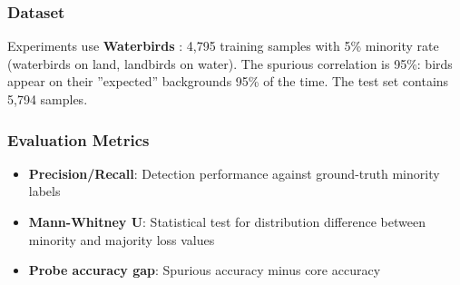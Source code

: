 
\subsubsection{Dataset}

Experiments use \textbf{Waterbirds} \citep{Sagawa2019}: 4,795 training samples with 5\% minority rate (waterbirds on land, landbirds on water). The spurious correlation is 95\%: birds appear on their ''expected'' backgrounds 95\% of the time. The test set contains 5,794 samples.

\subsubsection{Evaluation Metrics}

\begin{itemize}
\item \textbf{Precision/Recall}: Detection performance against ground-truth minority labels
\item \textbf{Mann-Whitney U}: Statistical test for distribution difference between minority and majority loss values
\item \textbf{Probe accuracy gap}: Spurious accuracy minus core accuracy
\end{itemize}

